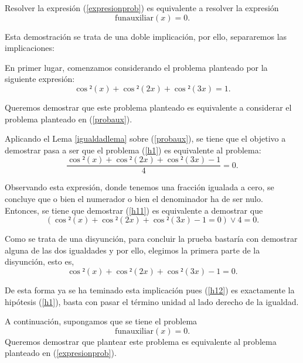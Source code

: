 \begin{lema}[Equivalencia]\label{lemaequivalenciaprob}
  Resolver la expresión (\ref{expresionprob}) es equivalente
  a resolver la expresión
  \begin{equation}\label{probaux}
    \text{funauxiliar}(x)=0.
  \end{equation}
\end{lema}
\begin{demostracion}
  Esta demostración se trata de una doble implicación, por ello,
  separaremos las implicaciones:

  \noindent
  \framebox{\longrightarrow}
  En primer lugar, comenzamos considerando el problema planteado
  por la siguiente expresión:
  \begin{equation}\label{h1}\tag{h1}
    \cos²(x)+\cos²(2x)+\cos²(3x)=1.
  \end{equation}

  Queremos demostrar que este problema planteado es equivalente a
  considerar el problema planteado en (\ref{probaux}).

  Aplicando el Lema \ref{igualdadlema} sobre (\ref{probaux}), se
  tiene que el objetivo a demostrar pasa a ser que el problema
  (\ref{h1}) es equivalente al problema:
  \begin{equation}\label{h11}
    \frac{\cos²(x)+\cos²(2x)+\cos²(3x)-1}{4}=0.
  \end{equation}

  Observando esta expresión, donde tenemos una fracción igualada
  a cero, se concluye que o bien el numerador o bien el denominador
  ha de ser nulo. Entonces, se tiene que demostrar (\ref{h11}) es
  equivalente a demostrar que
  \begin{equation}
    (\cos²(x)+\cos²(2x)+\cos²(3x)-1=0) \lor 4=0.
  \end{equation}

  Como se trata de una disyunción, para concluir la prueba bastaría
  con demostrar alguna de las dos igualdades y por ello, elegimos
  la primera parte de la disyunción, esto es,
  \begin{equation}\label{h12}
    \cos²(x)+\cos²(2x)+\cos²(3x)-1=0.
  \end{equation}

  De esta forma ya se ha teminado esta implicación pues (\ref{h12})
  es exactamente la hipótesis (\ref{h1}), basta con pasar el término
  unidad al lado derecho de la igualdad.


  \noindent
  \framebox{\longleftarrow} A continuación, supongamos que se tiene
  el problema
  \begin{equation}\label{h2}\tag{h2}
    \text{funauxiliar}(x)=0.
  \end{equation}
  Queremos demostrar que plantear este problema es equivalente al
  problema planteado en (\ref{expresionprob}).


\end{demostracion}
